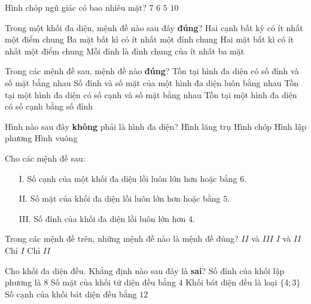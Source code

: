 \begin{ex}%
	Hình chóp ngũ giác có bao nhiêu mặt?
	\choice
	{$7$}
	{\True $6$}
	{$5$}
	{$10$}
\end{ex}
\begin{ex}%
	Trong một khối đa diện, mệnh đề nào sau đây \textbf{đúng}?
	\choice
	{Hai cạnh bất kỳ có ít nhất một điểm chung}
	{Ba mặt bất kì có ít nhất một đỉnh chung}
	{Hai mặt bất kì có ít nhất một điểm chung}
	{\True Mỗi đỉnh là đỉnh chung của ít nhất ba mặt}
\end{ex}
\begin{ex}%
	Trong các mệnh đề sau, mệnh đề nào \textbf{đúng}?
	\choice
	{\True Tồn tại hình đa diện có số đỉnh và số mặt bằng nhau}
	{Số đỉnh và số mặt của một hình đa diện luôn bằng nhau}
	{Tồn tại một hình đa diện có số cạnh và số mặt bằng nhau}
	{Tồn tại một hình đa diện có số cạnh bằng số đỉnh}
\end{ex}
\begin{ex}%
	Hình nào sau đây \textbf{không} phải là hình đa diện?
	\choice
	{Hình lăng trụ}
	{Hình chóp}
	{Hình lập phương}
	{\True Hình vuông}
\end{ex}
\begin{ex}%
	Cho các mệnh đề sau:
	\begin{itemize}
		\item[I.] Số cạnh của một khối đa diện lồi luôn lớn hơn hoặc bằng $6$.
		\item[II.] Số mặt của khối đa diện lồi luôn lớn hơn hoặc bằng $5$.
		\item[III.] Số đỉnh của khối đa diện lồi luôn lớn hơn $4$.
	\end{itemize}
	Trong các mệnh đề trên, những mệnh đề nào là mệnh đề đúng?
	\choice
	{$II$ và $III$}
	{$I$ và $II$}
	{\True Chỉ $I$}
	{Chỉ $II$}
\end{ex}
\begin{ex}%
	Cho khối đa diện đều. Khẳng định nào sau đây là \textbf{sai}?
	\choice
	{Số đỉnh của khối lập phương là $8$}
	{Số mặt của khối tứ diện đều bằng $4$}
	{\True Khối bát diện đều là loại $\{4;3\}$}
	{Số cạnh của khối bát diện đều bằng $12$}
\end{ex}
